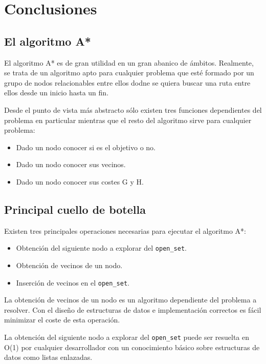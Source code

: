 
\section{Conclusiones}

\subsection{El algoritmo A*}

El algoritmo A* es de gran utilidad en un gran abanico de ámbitos.
Realmente, se trata de un algoritmo apto para cualquier problema
que esté formado por un grupo de nodos relacionables entre ellos
dodne se quiera buscar una ruta entre ellos desde un inicio hasta
un fin.

Desde el punto de vista más abstracto sólo existen tres funciones
dependientes del problema en particular mientras que el resto
del algoritmo sirve para cualquier problema:

\begin{itemize}[itemsep=0.25px]
    \item Dado un nodo conocer si es el objetivo o no.
    \item Dado un nodo conocer sus vecinos.
    \item Dado un nodo conocer sus costes G y H.
\end{itemize}

\subsection{Principal cuello de botella}

Existen tres principales operaciones necesarias para
ejecutar el algoritmo A*:

\begin{itemize}[itemsep=0.25px]
    \item Obtención del siguiente nodo a explorar del \lstinline{open_set}.
    \item Obtención de vecinos de un nodo.
    \item Inserción de vecinos en el \lstinline{open_set}.
\end{itemize}

La obtención de vecinos de un nodo es un algoritmo dependiente del problema a resolver.
Con el diseño de estructuras de datos e implementación correctos es fácil
minimizar el coste de esta operación.

La obtención del siguiente nodo a explorar del \lstinline{open_set}
puede ser resuelta en O(1) por cualquier desarrollador con un conocimiento
básico sobre estructuras de datos como listas enlazadas.

